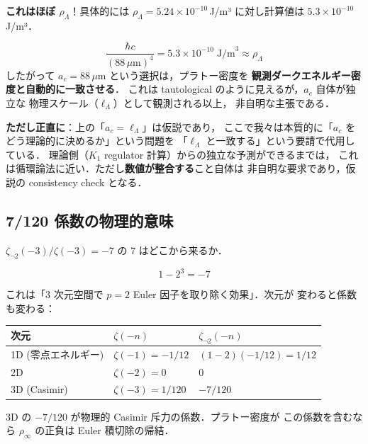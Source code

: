 \documentclass[11pt,a4paper]{article}
\begin{document}
\textbf{これはほぼ $\rho_\Lambda$}！具体的には $\rho_\Lambda = 5.24\times
10^{-10}$\,J/m³ に対し計算値は $5.3\times 10^{-10}$\,J/m³．

\begin{tcolorbox}[colback=green!5,colframe=green!60!black,title=数値的一致]
\begin{equation}
\frac{\hbar c}{(88\,\mu\text{m})^4} = 5.3\times 10^{-10}\;\text{J/m}^3 \approx \rho_\Lambda
\end{equation}
したがって $a_c = 88\,\mu$m という選択は，プラトー密度を
\textbf{観測ダークエネルギー密度と自動的に一致させる}．
これは tautological のように見えるが，$a_c$ 自体が独立な
物理スケール（$\ell_\Lambda$）として観測される以上，
非自明な主張である．
\end{tcolorbox}

\textbf{ただし正直に}：上の「$a_c = \ell_\Lambda$」は仮説であり，
ここで我々は本質的に「$a_c$ をどう理論的に決めるか」という問題を
「$\ell_\Lambda$ と一致する」という要請で代用している．
理論側（$K_1$ regulator 計算）からの独立な予測ができるまでは，
これは循環論法に近い．ただし\textbf{数値が整合する}こと自体は
非自明な要求であり，仮説の consistency check となる．

\subsection{7/120 係数の物理的意味}

$\zeta_{\neg 2}(-3)/\zeta(-3) = -7$ の 7 はどこから来るか．

\begin{equation}
1 - 2^3 = -7
\end{equation}

これは「3 次元空間で $p=2$ Euler 因子を取り除く効果」．次元が
変わると係数も変わる：
\begin{center}
\begin{tabular}{lll}
\toprule
次元 & $\zeta(-n)$ & $\zeta_{\neg 2}(-n)$ \\
\midrule
1D (零点エネルギー) & $\zeta(-1) = -1/12$ & $(1-2)(-1/12) = 1/12$ \\
2D & $\zeta(-2) = 0$ & $0$ \\
3D (Casimir) & $\zeta(-3) = 1/120$ & $-7/120$ \\
\bottomrule
\end{tabular}
\end{center}

3D の $-7/120$ が物理的 Casimir 斥力の係数．プラトー密度が
この係数を含むなら $\rho_\infty$ の正負は Euler 積切除の帰結．
\end{document}
